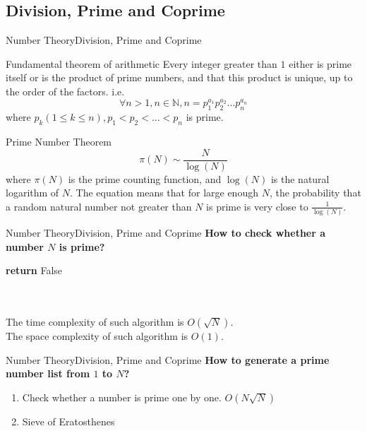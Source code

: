 \documentclass[mathserif,10pt]{beamer}
\begin{document}
\subsection{Division, Prime and Coprime}
\begin{frame}{Number Theory}{Division, Prime and Coprime}
\begin{block}{Fundamental theorem of arithmetic}
    Every integer greater than $1$ either is prime itself or is the product of prime numbers, and that this product is unique, up to the order of the factors. i.e. $$\forall n > 1, n \in \mathbb{N}, n = p_1^{a_1}p_2^{a_2} ... p_n^{a_n}$$ where $p_k (1\leq k\leq n), p_1<p_2<...<p_n$ is prime. 
\end{block}
\pause
\begin{block}{Prime Number Theorem}
    \begin{equation}
		\pi(N) \sim	 \frac{N}{\log(N)} \nonumber
	\end{equation}
	where $\pi(N)$ is the prime counting function, and $\log(N)$ is the natural logarithm of $N$. The equation means that for large enough $N$, the probability that a random natural number not greater than $N$ is prime is very close to $\frac{1}{\log(N)}$.
\end{block}
\end{frame}


\begin{frame}{Number Theory}{Division, Prime and Coprime}
\textbf{\large How to check whether a number $N$ is prime?}
\begin{algorithm}[H]
\begin{algorithmic}[1]
			\STATE \textbf{return} False
		\ENDIF
	\ENDFOR
\end{algorithmic}
\caption*{Pseudo-code for prime number checking.}
\end{algorithm}
\pause
~\\~\\
The time complexity of such algorithm is $O(\sqrt{N})$. \\
The space complexity of such algorithm is $O(1)$.

\end{frame}


\begin{frame}{Number Theory}{Division, Prime and Coprime}
\textbf{\large How to generate a prime number list from $1$ to $N$?}
\begin{enumerate}
	\item Check whether a number is prime one by one. \pause $O(N\sqrt{N})$ \pause
	\item Sieve of Eratosthenes 
\end{enumerate}
\end{frame}
\end{document}
